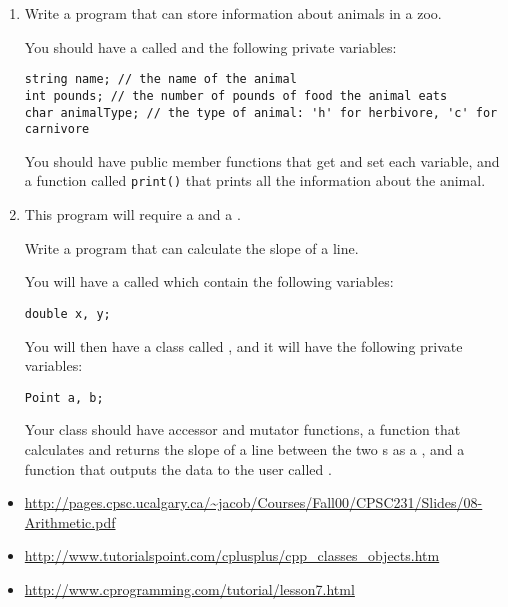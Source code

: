 \begin{enumerate}
\item Write a program that can store information about animals in a zoo.

You should have a  called  and the following private variables:

\begin{lstlisting}
string name; // the name of the animal
int pounds; // the number of pounds of food the animal eats
char animalType; // the type of animal: 'h' for herbivore, 'c' for carnivore
\end{lstlisting}

You should have public member functions that get and set each variable, and a function called \texttt{print()} that prints all the information about the animal.

\item This program will require a  and a .

Write a program that can calculate the slope of a line.

You will have a  called  which contain the following variables:

\begin{lstlisting}
double x, y;
\end{lstlisting}

You will then have a class called , and it will have the following private variables:

\begin{lstlisting}
Point a, b;
\end{lstlisting}

Your class should have accessor and mutator functions, a function that calculates and returns the slope of a line between the two s as a , and a function that outputs the data to the user called .
\end{enumerate}




\begin{itemize}
\item \url{http://pages.cpsc.ucalgary.ca/~jacob/Courses/Fall00/CPSC231/Slides/08-Arithmetic.pdf}
\item \url{http://www.tutorialspoint.com/cplusplus/cpp_classes_objects.htm}
\item \url{http://www.cprogramming.com/tutorial/lesson7.html}
\end{itemize}	
